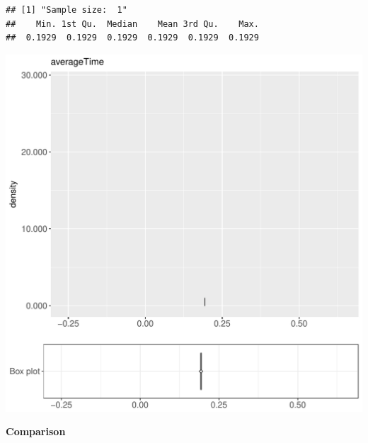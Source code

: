\documentclass{article}\usepackage[]{graphicx}\usepackage[]{color}
\makeatletter
\def\maxwidth{ %
  \ifdim\Gin@nat@width>\linewidth
    \linewidth
  \else
    \Gin@nat@width
  \fi
}
\newenvironment{kframe}{%
 \def\at@end@of@kframe{}%
 \ifinner\ifhmode%
  \def\at@end@of@kframe{\end{minipage}}%
  \begin{minipage}{\columnwidth}%
 \fi\fi%
 \def\FrameCommand##1{\hskip\@totalleftmargin \hskip-\fboxsep
 \colorbox{shadecolor}{##1}\hskip-\fboxsep
     \hskip-\linewidth \hskip-\@totalleftmargin \hskip\columnwidth}%
 \MakeFramed {\advance\hsize-\width
   \@totalleftmargin\z@ \linewidth\hsize
   \@setminipage}}%
 {\par\unskip\endMakeFramed%
 \at@end@of@kframe}
\newenvironment{knitrout}{}{} %
\makeatother
\begin{document}
\begin{knitrout}
\color{fgcolor}\begin{kframe}
\begin{verbatim}
## [1] "Sample size:  1"
##    Min. 1st Qu.  Median    Mean 3rd Qu.    Max. 
##  0.1929  0.1929  0.1929  0.1929  0.1929  0.1929
\end{verbatim}


{\ttfamily\noindent\bfseries{}}\end{kframe}
\includegraphics[width=\maxwidth]{figure/RH1_noCache_small-1} 

\end{knitrout}
  
 \textbf{Comparison}
  
\end{document}
